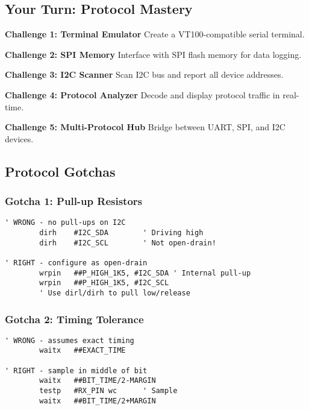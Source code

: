 \documentclass[11pt]{book}
\begin{document}
\hypertarget{your-turn-protocol-mastery}{%
\subsection{Your Turn: Protocol
Mastery}\label{your-turn-protocol-mastery}}

\begin{yourturn}
\textbf{Challenge 1: Terminal Emulator}
Create a VT100-compatible serial terminal.

\textbf{Challenge 2: SPI Memory}
Interface with SPI flash memory for data logging.

\textbf{Challenge 3: I2C Scanner}
Scan I2C bus and report all device addresses.

\textbf{Challenge 4: Protocol Analyzer}
Decode and display protocol traffic in real-time.

\textbf{Challenge 5: Multi-Protocol Hub}
Bridge between UART, SPI, and I2C devices.
\end{yourturn}

\hypertarget{protocol-gotchas}{%
\subsection{Protocol Gotchas}\label{protocol-gotchas}}

\hypertarget{gotcha-1-pull-up-resistors}{%
\subsubsection{Gotcha 1: Pull-up
Resistors}\label{gotcha-1-pull-up-resistors}}

\begin{lstlisting}
' WRONG - no pull-ups on I2C
        dirh    #I2C_SDA        ' Driving high
        dirh    #I2C_SCL        ' Not open-drain!
        
' RIGHT - configure as open-drain
        wrpin   ##P_HIGH_1K5, #I2C_SDA ' Internal pull-up
        wrpin   ##P_HIGH_1K5, #I2C_SCL
        ' Use dirl/dirh to pull low/release
\end{lstlisting}

\hypertarget{gotcha-2-timing-tolerance}{%
\subsubsection{Gotcha 2: Timing
Tolerance}\label{gotcha-2-timing-tolerance}}

\begin{lstlisting}
' WRONG - assumes exact timing
        waitx   ##EXACT_TIME
        
' RIGHT - sample in middle of bit
        waitx   ##BIT_TIME/2-MARGIN
        testp   #RX_PIN wc      ' Sample
        waitx   ##BIT_TIME/2+MARGIN
\end{lstlisting}
\end{document}

